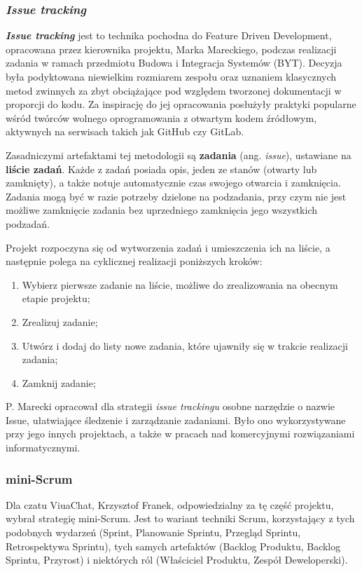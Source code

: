 \documentclass[11pt,oneside,a4paper,titlepage,onecolumn]{article}
\begin{document}
\subsubsection{\textit{Issue tracking}}
\textit{\textbf{Issue tracking}} jest to technika pochodna do Feature Driven Development, opracowana przez 
kierownika projektu, Marka Mareckiego, podczas
realizacji zadania w ramach przedmiotu Budowa i Integracja Systemów (BYT). Decyzja była podyktowana niewielkim
rozmiarem zespołu oraz uznaniem klasycznych metod zwinnych za zbyt obciążające pod względem tworzonej 
dokumentacji w proporcji do kodu. Za inspirację do jej opracowania posłużyły praktyki popularne wśród twórców 
wolnego oprogramowania z otwartym kodem źródłowym, aktywnych na serwisach takich jak GitHub czy GitLab. 

Zasadniczymi artefaktami tej metodologii są \textbf{zadania} (ang. \textit{issue}), ustawiane na 
\textbf{liście zadań}. Każde z zadań posiada opis, jeden ze stanów (otwarty lub zamknięty), a także
notuje automatycznie czas swojego otwarcia i zamknięcia. Zadania mogą być w razie potrzeby dzielone na podzadania,
przy czym nie jest możliwe zamknięcie zadania bez uprzedniego zamknięcia jego wszystkich podzadań.

Projekt rozpoczyna się od wytworzenia zadań i umieszczenia ich na liście, a następnie 
polega na cyklicznej realizacji poniższych kroków:

\begin{enumerate}
	\item Wybierz pierwsze zadanie na liście, możliwe do zrealizowania na obecnym etapie projektu;
	\item Zrealizuj zadanie;
	\item Utwórz i dodaj do listy nowe zadania, które ujawniły się w trakcie realizacji zadania;
	\item Zamknij zadanie;
\end{enumerate}

P. Marecki opracował dla strategii \textit{issue trackingu} osobne narzędzie o nazwie Issue, ułatwiające
śledzenie i zarządzanie zadaniami. Było ono wykorzystywane przy jego innych projektach, a także w
pracach nad komercyjnymi rozwiązaniami informatycznymi.

\subsubsection{mini-Scrum}
Dla czatu ViuaChat, Krzysztof Franek, odpowiedzialny za tę część projektu, wybrał strategię mini-Scrum. Jest to
wariant techniki Scrum, korzystający z tych podobnych wydarzeń (Sprint, Planowanie Sprintu, Przegląd Sprintu, 
Retrospektywa Sprintu), tych samych artefaktów (Backlog Produktu, Backlog Sprintu, Przyrost) i niektórych ról 
(Właściciel Produktu, Zespół Deweloperski). 
\end{document}
